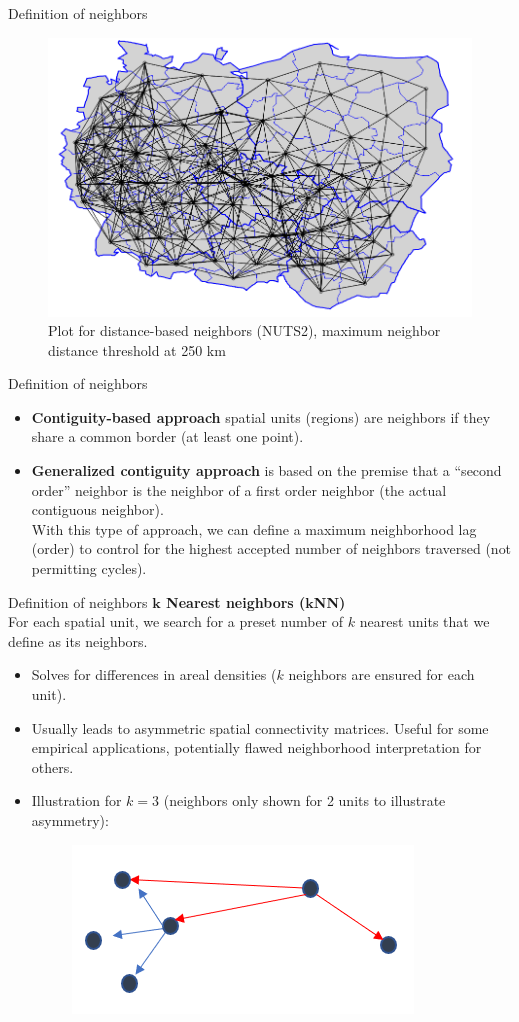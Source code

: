 \documentclass{beamer}
\begin{document}
\begin{frame}{Definition of neighbors}
\begin{figure}
	\includegraphics[width=.7\textwidth]{IMG/sp_neigb.PNG}
	\caption[]{Plot for distance-based neighbors (NUTS2), maximum neighbor distance threshold at 250 km}
\end{figure}
\end{frame}
\begin{frame}{Definition of neighbors}
\begin{itemize}
\item \textbf{Contiguity-based approach} spatial units (regions) are neighbors if they share a common border (at least one point).
\bigskip 
\item \textbf{Generalized contiguity approach} is based on the premise that a ``second order'' neighbor is the neighbor of a first order neighbor (the actual contiguous neighbor). \\ \smallskip With this type of approach, we can define a maximum neighborhood lag (order) to control for the highest accepted number
of neighbors traversed (not permitting cycles).	
\end{itemize}
\end{frame}
\begin{frame}{Definition of neighbors}
\textbf{$\bm{k}$ Nearest neighbors ($\bm{k}$NN)} \\
\medskip
For each spatial unit, we search for a preset number of $k$ nearest units that we define as its neighbors. 
\medskip
\begin{itemize}
	\item Solves for differences in areal densities ($k$ neighbors are ensured for each unit).
	\smallskip
	\item Usually leads to asymmetric spatial connectivity matrices. Useful for some empirical applications, potentially flawed neighborhood interpretation for others. 
	\smallskip
	\item Illustration for $k = 3$   (neighbors only shown for 2 units to illustrate asymmetry):
	\begin{figure}
		\includegraphics[width=.2\textwidth]{IMG/sp_neigb2.PNG}
	\end{figure}
\end{itemize}
\end{frame}
\end{document}
